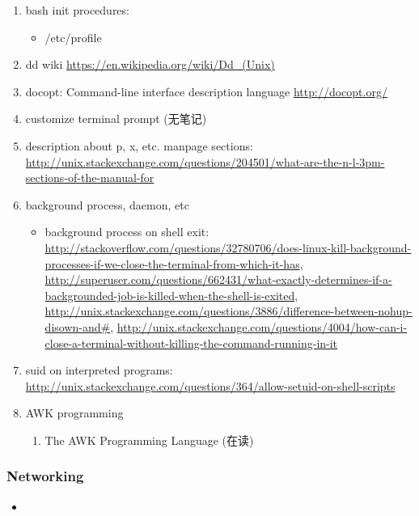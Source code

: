 \documentclass{article}
\begin{document}
\begin{enumerate}
\begin{enumerate}
        \end{enumerate}
    \item bash init procedures:
        \begin{itemize}
            \item /etc/profile
        \end{itemize}
    \item dd wiki \url{https://en.wikipedia.org/wiki/Dd_(Unix)}
    \item docopt: Command-line interface description language \url{http://docopt.org/}
    \item customize terminal prompt (无笔记)
    \item description about p, x, etc. manpage sections: \url{http://unix.stackexchange.com/questions/204501/what-are-the-n-l-3pm-sections-of-the-manual-for}
    \item background process, daemon, etc
        \begin{itemize}
            \item background process on shell exit: \url{http://stackoverflow.com/questions/32780706/does-linux-kill-background-processes-if-we-close-the-terminal-from-which-it-has}, \url{http://superuser.com/questions/662431/what-exactly-determines-if-a-backgrounded-job-is-killed-when-the-shell-is-exited}, \url{http://unix.stackexchange.com/questions/3886/difference-between-nohup-disown-and#}, \url{http://unix.stackexchange.com/questions/4004/how-can-i-close-a-terminal-without-killing-the-command-running-in-it}
        \end{itemize}
    \item suid on interpreted programs: \url{http://unix.stackexchange.com/questions/364/allow-setuid-on-shell-scripts}
    \item AWK programming
        \begin{enumerate}
            \item The AWK Programming Language (在读)
        \end{enumerate}
\end{enumerate}
%
\subsubsection{Networking}
%
\begin{itemize}
    \item
\end{itemize}
%
\end{document}
